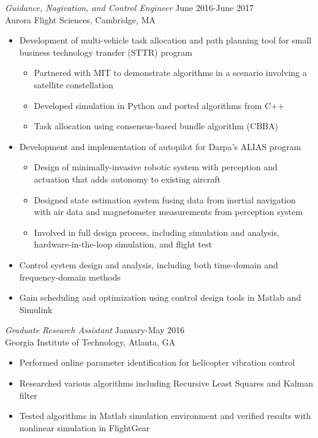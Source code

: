 \documentclass[margin]{res} %
\begin{document}
\begin{resume}
{\sl Guidance, Nagivation, and Control Engineer} \hfill June 2016-June 2017 \\
Aurora Flight Sciences, Cambridge, MA
\begin{itemize} \itemsep -2pt %
\item Development of multi-vehicle task allocation and path planning tool for small business technology transfer (STTR) program
\vspace{-2mm}
	\begin{itemize}
	\item Partnered with MIT to demonstrate algorithms in a scenario involving a satellite constellation
	\item Developed simulation in Python and ported algorithms from C++
	\item Task allocation using consensus-based bundle algorithm (CBBA)
	\end{itemize}
\item Development and implementation of autopilot for Darpa's ALIAS program
\vspace{-2mm}
	\begin{itemize}
	\item Design of minimally-invasive robotic system with perception and actuation that adds autonomy to existing aircraft
	\item Designed state estimation system fusing data from inertial navigation with air data and magnetometer measurements from perception system
	\item Involved in full design process, including simulation and analysis, hardware-in-the-loop simulation, and flight test
	\end{itemize}
\item Control system design and analysis, including both time-domain and frequency-domain methods
\item Gain scheduling and optimization using control design tools in Matlab and Simulink
\end{itemize}

{\sl Graduate Research Assistant} \hfill January-May 2016\\
Georgia Institute of Technology, Atlanta, GA
\begin{itemize} \itemsep -2pt %
\item Performed online parameter identification for helicopter vibration control
\item Researched various algorithms including Recursive Least Squares and Kalman filter
\item Tested algorithms in Matlab simulation environment and verified results with nonlinear simulation in FlightGear
\end{itemize}


\end{resume}
\end{document}
